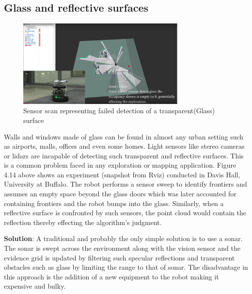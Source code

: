 \subsection{Glass and reflective surfaces}

\begin{figure}
    \centering
    \includegraphics[width=0.75\textwidth]{images/Glass_ppt.png}    
    \caption{Sensor scan representing failed detection of a transparent(Glass) surface}
    \label{fig:my_label}
\end{figure}

Walls and windows made of glass can be found in almost any urban setting such as airports, malls, offices and even some homes. 
Light sensors like stereo cameras or lidars are incapable of detecting such transparent and reflective surfaces. This is a common problem faced in any exploration or mapping application. Figure 4.14 above shows an experiment (snapshot from Rviz) conducted in Davis Hall, University at Buffalo. The robot performs a sensor sweep to identify frontiers and assumes an empty space beyond the glass doors which was later accounted for containing frontiers and the robot bumps into the glass. Similarly, when a reflective surface is confronted by such sensors, the point cloud would contain the reflection thereby effecting the algorithm's judgment.

\textbf{Solution}:
A traditional and probably the only simple solution is to use a sonar. The sonar is swept across the environment along with the vision sensor and the evidence grid is updated by filtering such specular reflections and transparent obstacles such as glass by limiting the range to that of sonar. The disadvantage in this approach is the addition of a new equipment to the robot making it expensive and bulky.

